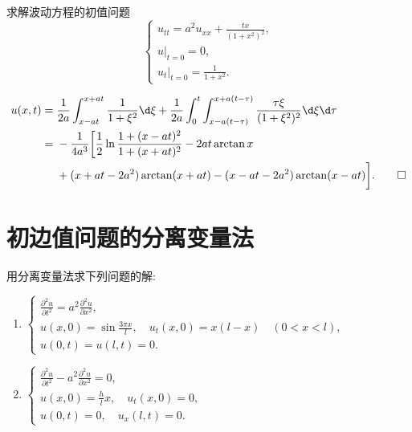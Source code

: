 \begin{exercise}[9]
  求解波动方程的初值问题
  \[\begin{cases}
    u_{tt} = a^2u_{xx} + \frac{tx}{(1+x^2)^2}, \\
    u|_{t=0} = 0, \\
    u_t|_{t=0} = \frac{1}{1+x^2}.
  \end{cases}\]  
\end{exercise}


\begin{solve}
  \begin{align*}
    u(x,t)
    ={} & \frac{1}{2a}\int_{x-at}^{x+at}\frac{1}{1+\xi^2}\d\xi
      + \frac{1}{2a}\int_0^t\int_{x-a(t-\tau)}^{x+a(t-\tau)}
      \frac{\tau\xi}{(1+\xi^2)^2}\d\xi\d\tau \\
    ={} & -\frac{1}{4a^3}\bigg[\frac{1}{2}\ln\frac{1+(x-at)^2}{1+(x+at)^2}
          - 2at\arctan x \\
        & + (x+at-2a^2)\arctan (x+at) - (x-at-2a^2)\arctan (x-at)\bigg].\qedhere
  \end{align*}
\end{solve}


\section{初边值问题的分离变量法}

\begin{exercise}
  用分离变量法求下列问题的解:
  \begin{enumerate}[(1)]
    \item $\begin{cases}
      \frac{\partial^2u}{\partial t^2} = a^2 \frac{\partial^2u}{\partial x^2}, \\
      u(x,0) = \sin\frac{3\pi x}{l},\quad u_t(x,0) = x(l-x)\quad (0<x<l), \\
      u(0,t) = u(l,t) = 0.
    \end{cases}$
    \item $\begin{cases}
      \frac{\partial^2u}{\partial t^2} - a^2 \frac{\partial^2u}{\partial x^2} = 0, \\
      u(x,0) = \frac{h}{l}x, \quad u_t(x,0) = 0, \\
      u(0,t) = 0,\quad u_x(l,t) = 0.  
    \end{cases}$
  \end{enumerate}
\end{exercise}

